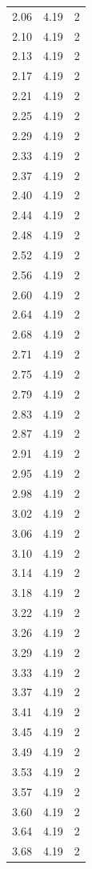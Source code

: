 \begin{longtable}{lrr}
  2.06 & 4.19 & 2 \\
  2.10 & 4.19 & 2 \\
  2.13 & 4.19 & 2 \\
  2.17 & 4.19 & 2 \\
  2.21 & 4.19 & 2 \\
  2.25 & 4.19 & 2 \\
  2.29 & 4.19 & 2 \\
  2.33 & 4.19 & 2 \\
  2.37 & 4.19 & 2 \\
  2.40 & 4.19 & 2 \\
  2.44 & 4.19 & 2 \\
  2.48 & 4.19 & 2 \\
  2.52 & 4.19 & 2 \\
  2.56 & 4.19 & 2 \\
  2.60 & 4.19 & 2 \\
  2.64 & 4.19 & 2 \\
  2.68 & 4.19 & 2 \\
  2.71 & 4.19 & 2 \\
  2.75 & 4.19 & 2 \\
  2.79 & 4.19 & 2 \\
  2.83 & 4.19 & 2 \\
  2.87 & 4.19 & 2 \\
  2.91 & 4.19 & 2 \\
  2.95 & 4.19 & 2 \\
  2.98 & 4.19 & 2 \\
  3.02 & 4.19 & 2 \\
  3.06 & 4.19 & 2 \\
  3.10 & 4.19 & 2 \\
  3.14 & 4.19 & 2 \\
  3.18 & 4.19 & 2 \\
  3.22 & 4.19 & 2 \\
  3.26 & 4.19 & 2 \\
  3.29 & 4.19 & 2 \\
  3.33 & 4.19 & 2 \\
  3.37 & 4.19 & 2 \\
  3.41 & 4.19 & 2 \\
  3.45 & 4.19 & 2 \\
  3.49 & 4.19 & 2 \\
  3.53 & 4.19 & 2 \\
  3.57 & 4.19 & 2 \\
  3.60 & 4.19 & 2 \\
  3.64 & 4.19 & 2 \\
  3.68 & 4.19 & 2 \\

\end{longtable}
